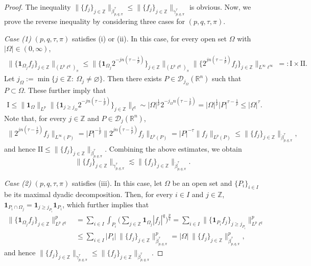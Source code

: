 \documentclass[11pt, reqno]{amsart}
\theoremstyle{definition}
\theoremstyle{remark}
\numberwithin{equation}{section}
\newcommand{\Z}{\mathbb Z}
\newcommand{\one}{\mathbf{1}}
\begin{document}
\begin{proof}
The inequality $\|\{f_j\}_{j\in\mathbb Z}\|_{\dot\beta^\tau_{p,q,\pi}}
\leq \|\{f_j\}_{j\in\mathbb Z}\|_{\dot\gamma^\tau_{p,q,\pi}}$ is obvious.
Now, we prove the reverse inequality
by considering three cases for $(p,q,\tau,\pi)$.

\emph{Case (1)} $(p,q,\tau,\pi)$ satisfies (i) or (ii).
In this case, for every open set $\Omega$ with $|\Omega|\in(0,\infty)$,
\begin{align*}
\big\|\{\one_{\Omega_j}f_j\}_{j\in\Z}\big\|_{(L^p\ell^q)_{\pi}}
\leq \Big\|\Big\{\one_{\Omega_j}2^{-jn(\tau-\frac1p)}\Big\}_{j\in\Z}\Big\|_{(L^p\ell^q)_{\pi}}
\Big\|\Big\{2^{jn(\tau-\frac1p)}f_j\Big\}_{j\in\Z}\Big\|_{L^\infty\ell^\infty}
=:\mathrm{I}\times \mathrm{II}.
\end{align*}
Let $j_\Omega:=\min\{j\in\mathbb Z:\ \Omega_j \neq \varnothing \}$.
Then there exists $P\in \mathscr D_{j_\Omega}(\mathbb R^n)$
such that $P\subset\Omega$. These further imply that
\begin{align*}
\mathrm{I}
\leq \|\one_{\Omega}\|_{L^p} \Big\|\Big\{\mathbf 1_{j\geq j_\Omega}2^{-jn(\tau-\frac1p)}\Big\}_{j\in\Z}\Big\|_{\ell^q}
\sim |\Omega|^{\frac 1p} 2^{-j_\Omega n(\tau-\frac1p)}
= |\Omega|^{\frac 1p} |P|^{\tau-\frac1p}
\leq |\Omega|^\tau.
\end{align*}
Note that, for every $j\in\mathbb Z$ and $P\in\mathscr D_j(\mathbb R^n)$,
\begin{align*}
\Big\|2^{jn(\tau-\frac1p)}f_j\Big\|_{L^\infty(P)}
=|P|^{-\frac 1p} \Big\|2^{jn(\tau-\frac1p)}f_j\Big\|_{L^p(P)}
=|P|^{-\tau} \|f_j\|_{L^p(P)}
\leq \|\{f_j\}_{j\in\mathbb Z}\|_{\dot\beta^\tau_{p,q,\pi}},
\end{align*}
and hence $\mathrm{II}\leq\|\{f_j\}_{j\in\mathbb Z}\|_{\dot\beta^\tau_{p,q,\pi}}$.
Combining the above estimates, we obtain
$$\|\{f_j\}_{j\in\mathbb Z}\|_{\dot\gamma^\tau_{p,q,\pi}}
\lesssim\|\{f_j\}_{j\in\mathbb Z}\|_{\dot\beta^\tau_{p,q,\pi}}.$$

\emph{Case (2)} $(p,q,\tau,\pi)$ satisfies (iii).
In this case, let $\Omega$ be an open set and
$\{P_i\}_{i\in I}$ be its maximal dyadic decomposition.
Then, for every $i\in I$ and $j\in\mathbb Z$,
$\mathbf 1_{P_i\cap \Omega_j} = \mathbf 1_{j\geq j_{P_i}} \mathbf 1_{P_i}$,
which further implies that
\begin{align*}
\big\|\{\one_{\Omega_j}f_j\}_{j\in\Z}\big\|_{L^p\ell^q}^p
&= \sum_{i\in I} \int_{P_i} \Bigg( \sum_{j\in\mathbb Z}
\one_{\Omega_j} |f_j|^q \Bigg)^{\frac pq}
= \sum_{i\in I} \big\|\{\one_{P_i} f_j\}_{j\geq j_{P_i}}\big\|_{L^p\ell^q}^p \\
&\leq \sum_{i\in I} |P_i| \, \|\{f_j\}_{j\in\mathbb Z}\|_{\dot\beta^\tau_{p,q,\pi}}^p
=|\Omega| \, \|\{f_j\}_{j\in\mathbb Z}\|_{\dot\beta^\tau_{p,q,\pi}}^p,
\end{align*}
and hence $\|\{f_j\}_{j\in\mathbb Z}\|_{\dot\gamma^\tau_{p,q,\pi}}
\leq \|\{f_j\}_{j\in\mathbb Z}\|_{\dot\beta^\tau_{p,q,\pi}}$.


\end{proof}
\end{document}
